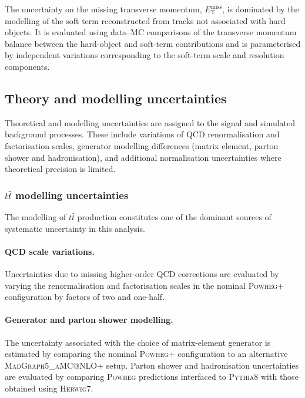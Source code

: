 The uncertainty on the missing transverse momentum, $E_{\mathrm{T}}^{\mathrm{miss}}$, is dominated by the modelling of the soft term reconstructed from tracks not associated with hard objects.
It is evaluated using data--MC comparisons of the transverse momentum balance between the hard-object and soft-term contributions and is parameterised by independent variations corresponding to the soft-term scale and resolution components.

\subsection{Theory and modelling uncertainties}
\label{sec:syst_theory}

Theoretical and modelling uncertainties are assigned to the signal and simulated background processes.
These include variations of QCD renormalisation and factorisation scales, generator modelling differences (matrix element, parton shower and hadronisation), and additional normalisation uncertainties where theoretical precision is limited.

\subsubsection{$t\bar{t}$ modelling uncertainties}

The modelling of $t\bar{t}$ production constitutes one of the dominant sources of systematic uncertainty in this analysis.

\paragraph{QCD scale variations.}

Uncertainties due to missing higher-order QCD corrections are evaluated by varying the renormalisation and factorisation scales in the nominal {\scshape Powheg}+  configuration by factors of two and one-half.

\paragraph{Generator and parton shower modelling.}

The uncertainty associated with the choice of matrix-element generator is estimated by comparing the nominal {\scshape Powheg}+ configuration to an alternative {\scshape MadGraph5\allowbreak\_aMC@NLO}+ setup.
Parton shower and hadronisation uncertainties are evaluated by comparing {\scshape Powheg} predictions interfaced to {\scshape Pythia8} with those obtained using {\scshape Herwig7}.

